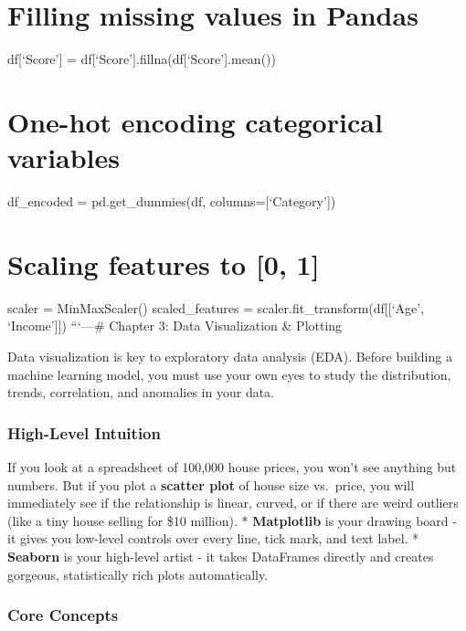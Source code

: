 \section{Filling missing values in
Pandas}\label{filling-missing-values-in-pandas}

df{[}`Score'{]} = df{[}`Score'{]}.fillna(df{[}`Score'{]}.mean())

\section{One-hot encoding categorical
variables}\label{one-hot-encoding-categorical-variables}

df\_encoded = pd.get\_dummies(df, columns={[}`Category'{]})

\section{Scaling features to {[}0, 1{]}}\label{scaling-features-to-0-1}

scaler = MinMaxScaler() scaled\_features =
scaler.fit\_transform(df{[}{[}`Age', `Income'{]}{]}) ```\n\n---\n\n\#
Chapter 3: Data Visualization \& Plotting

Data visualization is key to exploratory data analysis (EDA). Before
building a machine learning model, you must use your own eyes to study
the distribution, trends, correlation, and anomalies in your data.

\subsubsection{High-Level Intuition}\label{high-level-intuition-2}

If you look at a spreadsheet of 100,000 house prices, you won't see
anything but numbers. But if you plot a \textbf{scatter plot} of house
size vs.~price, you will immediately see if the relationship is linear,
curved, or if there are weird outliers (like a tiny house selling for
\$10 million). * \textbf{Matplotlib} is your drawing board - it gives
you low-level controls over every line, tick mark, and text label. *
\textbf{Seaborn} is your high-level artist - it takes DataFrames
directly and creates gorgeous, statistically rich plots automatically.

\subsubsection{Core Concepts}\label{core-concepts}

